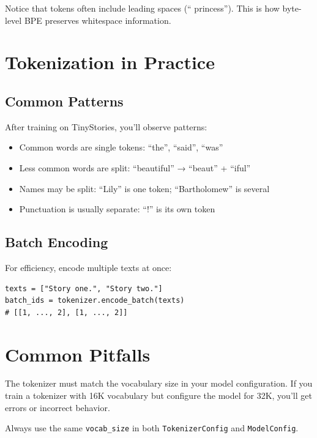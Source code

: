 \begin{note}
Notice that tokens often include leading spaces (`` princess''). This is how byte-level BPE preserves whitespace information.
\end{note}

\section{Tokenization in Practice}

\subsection{Common Patterns}

After training on TinyStories, you'll observe patterns:

\begin{itemize}
    \item Common words are single tokens: ``the'', ``said'', ``was''
    \item Less common words are split: ``beautiful'' → ``beaut'' + ``iful''
    \item Names may be split: ``Lily'' is one token; ``Bartholomew'' is several
    \item Punctuation is usually separate: ``!'' is its own token
\end{itemize}

\subsection{Batch Encoding}

For efficiency, encode multiple texts at once:

\begin{lstlisting}[style=python]
texts = ["Story one.", "Story two."]
batch_ids = tokenizer.encode_batch(texts)
# [[1, ..., 2], [1, ..., 2]]
\end{lstlisting}

\section{Common Pitfalls}

\begin{pitfall}[title=Tokenizer Mismatch]
The tokenizer must match the vocabulary size in your model configuration. If you train a tokenizer with 16K vocabulary but configure the model for 32K, you'll get errors or incorrect behavior.

Always use the same \texttt{vocab\_size} in both \texttt{TokenizerConfig} and \texttt{ModelConfig}.
\end{pitfall}

